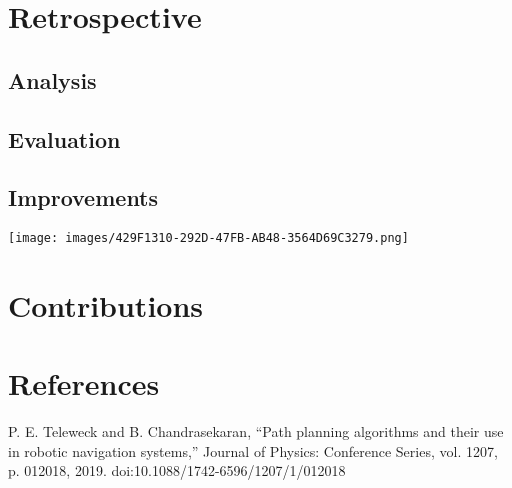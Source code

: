 \documentclass[10pt,english]{article}
\begin{document}

\clearpage

\section*{Retrospective}
\clearpage

\subsection*{Analysis}


\clearpage

\subsection*{Evaluation}


\clearpage

\subsection*{Improvements}
\clearpage

\vspace*{\fill}
\begin{center}
\texttt{[image: images/429F1310-292D-47FB-AB48-3564D69C3279.png]}
\end{center}
\vfill
\thispagestyle{empty}
\clearpage

\section*{Contributions}
\clearpage

\section*{References}

\begin{enumerate}[leftmargin=*,label={\texttt{[\arabic*]}},noitemsep]
    \item P. E. Teleweck and B. Chandrasekaran, “Path planning algorithms and their use in robotic navigation systems,” Journal of Physics: Conference Series, vol. 1207, p. 012018, 2019. doi:10.1088/1742-6596/1207/1/012018
\end{enumerate}
\end{document}

